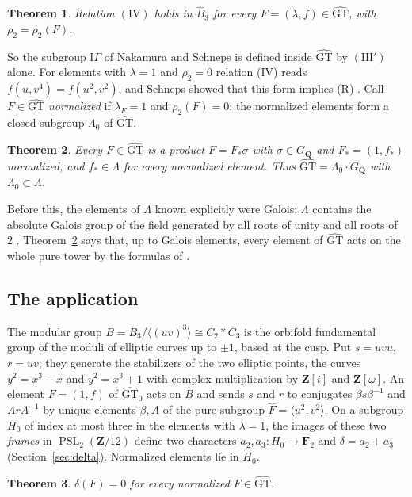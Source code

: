 \documentclass[11pt,a4paper]{article}
\theoremstyle{plain}
\newtheorem{theorem}{Theorem}
\theoremstyle{definition}
\theoremstyle{remark}
\newcommand{\GT}{\widehat{\mathrm{GT}}}
\newcommand{\GTz}{\widehat{\mathrm{GT}}_0}
\newcommand{\Z}{\mathbf Z}
\newcommand{\F}{\mathbf F}
\newcommand{\GQ}{G_{\mathbf Q}}
\newcommand{\Fh}{\widehat F}
\newcommand{\Bh}{\widehat B}
\newcommand{\PSL}{\operatorname{PSL}}
\begin{document}
\begin{theorem}\label{thm:IV}
Relation $(\mathrm{IV})$ holds in $\Bh_3$ for every $F=(\lambda,f)\in\GT$, with $\rho_2=\rho_2(F)$.
\end{theorem}

So the subgroup $\mathrm{I}\Gamma$ of Nakamura and Schneps is defined inside $\GT$ by $(\mathrm{III}')$ alone. For
elements with $\lambda=1$ and $\rho_2=0$ relation (IV) reads $f(u,v^4)=f(u^2,v^2)$, and Schneps showed that this
form implies (R) \cite[p.~670]{S}. Call $F\in\GT$ \emph{normalized} if $\lambda_F=1$ and $\rho_2(F)=0$; the
normalized elements form a closed subgroup $\Lambda_0$ of $\GT$.

\begin{theorem}\label{thm:Lambda}
Every $F\in\GT$ is a product $F=F_*\sigma$ with $\sigma\in\GQ$ and $F_*=(1,f_*)$ normalized, and $f_*\in\Lambda$
for every normalized element. Thus $\GT=\Lambda_0\cdot\GQ$ with $\Lambda_0\subset\Lambda$.
\end{theorem}

Before this, the elements of $\Lambda$ known explicitly were Galois: $\Lambda$ contains the absolute Galois group
of the field generated by all roots of unity and all roots of $2$ \cite[p.~3]{HLS}. Theorem~\ref{thm:Lambda} says
that, up to Galois elements, every element of $\GT$ acts on the whole pure tower by the formulas of \cite{HLS}.

\subsection*{The application}
The modular group $B=B_3/\langle(uv)^3\rangle\cong C_2*C_3$ is the orbifold fundamental group of the moduli of
elliptic curves up to $\pm1$, based at the cusp. Put $s=uvu$, $r=uv$; they generate the stabilizers of the two
elliptic points, the curves $y^2=x^3-x$ and $y^2=x^3+1$ with complex multiplication by $\Z[i]$ and $\Z[\omega]$.
An element $F=(1,f)$ of $\GTz$ acts on $\Bh$ and sends $s$ and $r$ to conjugates
$\beta s\beta^{-1}$ and $ArA^{-1}$ by unique elements $\beta,A$ of the pure subgroup
$\Fh=\overline{\langle u^2,v^2\rangle}$. On a subgroup $H_0$ of index at most three in the elements with
$\lambda=1$, the images of these two \emph{frames} in $\PSL_2(\Z/12)$ define two characters $a_2,a_3:H_0\to\F_2$ and
$\delta=a_2+a_3$ (Section~\ref{sec:delta}). Normalized elements lie in $H_0$.

\begin{theorem}\label{thm:delta}
$\delta(F)=0$ for every normalized $F\in\GT$.
\end{theorem}
\end{document}
